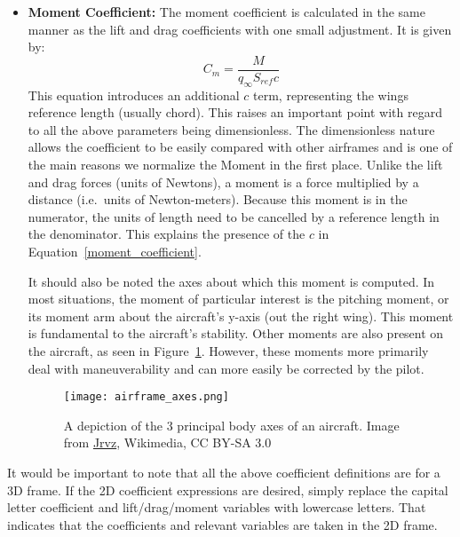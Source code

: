 \documentclass{article}
\begin{document}
\begin{itemize}
\begin{itemize}
        \item[] \textbf{Moment Coefficient:}
        The moment coefficient is calculated in the same manner as the lift and drag coefficients with one small adjustment. It is given by:
        \begin{equation}
            C_m = \frac{M}{q_{\infty} S_{ref} c}\label{moment_coefficient}
        \end{equation}
        This equation introduces an additional $c$ term, representing the wings reference length (usually chord). This raises an important point with regard to all the above parameters being dimensionless. The dimensionless nature allows the coefficient to be easily compared with other airframes and is one of the main reasons we normalize the Moment in the first place. Unlike the lift and drag forces (units of Newtons), a moment is a force multiplied by a distance (i.e.\ units of Newton-meters).
        Because this moment is in the numerator, the units of length need to be cancelled by a reference length in the denominator. This explains the presence of the $c$ in Equation~\eqref{moment_coefficient}.

       It should also be noted the axes about which this moment is computed. In most situations, the moment of particular interest is the pitching moment, or its moment arm about the aircraft's y-axis (out the right wing). This moment is fundamental to the aircraft's stability. Other moments are also present on the aircraft, as seen in Figure~\ref{fig:airframe_axes}. However, these moments more primarily deal with maneuverability and can more easily be corrected by the pilot.
        \begin{figure}[H]
            \hspace*{\dimexpr\labelsep+\labelwidth}
            \begin{minipage}{0.915\linewidth}
                \centering
                \texttt{[image: airframe\_axes.png]}
                \captionsetup{width=\linewidth}
                \caption{A depiction of the 3 principal body axes of an aircraft. Image from 
                \href{https://commons.wikimedia.org/wiki/File:Yaw_Axis_Corrected.svg}{Jrvz}, Wikimedia, CC BY-SA 3.0}\label{fig:airframe_axes}
            \end{minipage}
        \end{figure}

    \end{itemize}
    It would be important to note that all the above coefficient definitions are for a 3D frame. If the 2D coefficient expressions are desired, simply replace the capital letter coefficient and lift/drag/moment variables with lowercase letters. That indicates that the coefficients and relevant variables are taken in the 2D frame.
\end{itemize}
\end{document}
